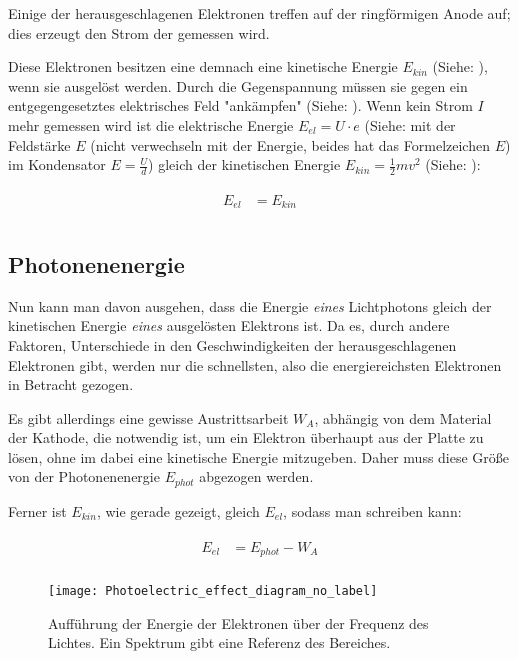 Einige der herausgeschlagenen Elektronen treffen auf der ringförmigen Anode auf; dies erzeugt den Strom der gemessen wird.

Diese Elektronen besitzen eine demnach eine kinetische Energie $E_{kin}$ (Siehe: ), wenn sie ausgelöst werden. Durch die Gegenspannung müssen sie gegen ein entgegengesetztes elektrisches Feld "ankämpfen" (Siehe: ). Wenn kein Strom $I$ mehr gemessen wird ist die elektrische Energie $E_{el} = U \cdot e$ (Siehe:  mit der Feldstärke $E$ (nicht verwechseln mit der Energie, beides hat das Formelzeichen $E$) im Kondensator $E=\frac{U}{d}$) gleich der kinetischen Energie $E_{kin} = \frac{1}{2} m v^2$ (Siehe: ):

\begin{align}
\begin{split}
	E_{el} &= E_{kin} \\
\end{split}
\end{align}


\subsection{Photonenenergie}

Nun kann man davon ausgehen, dass die Energie \emph{eines} Lichtphotons gleich der kinetischen Energie \emph{eines} ausgelösten Elektrons ist. Da es, durch andere Faktoren, Unterschiede in den Geschwindigkeiten der herausgeschlagenen Elektronen gibt, werden nur die schnellsten, also die energiereichsten Elektronen in Betracht gezogen. 

Es gibt allerdings eine gewisse Austrittsarbeit $W_A$, abhängig von dem Material der Kathode, die notwendig ist, um ein Elektron überhaupt aus der Platte zu lösen, ohne im dabei eine kinetische Energie mitzugeben. Daher muss diese Größe von der Photonenenergie $E_{phot}$ abgezogen werden.

Ferner ist $E_{kin}$, wie gerade gezeigt, gleich $E_{el}$, sodass man schreiben kann:

\begin{align} \label{eq:EelmitWA}
\begin{split}
	E_{el} &= E_{phot} - W_A \\
\end{split}
\end{align}

\begin{figure}[h!]
	\centering
	\texttt{[image: Photoelectric\_effect\_diagram\_no\_label]}
	\caption{Aufführung der Energie der Elektronen über der Frequenz des Lichtes. Ein Spektrum gibt eine Referenz des Bereiches.}
	\label{fig:Fotoeffekt}
\end{figure}

